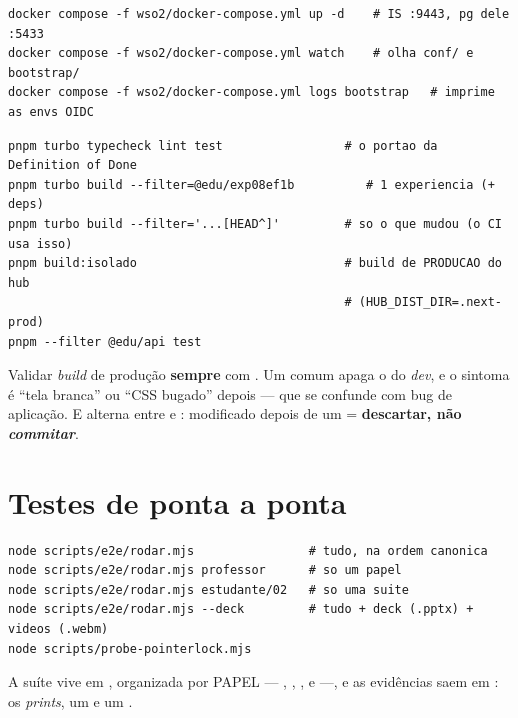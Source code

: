 \begin{lstlisting}[language=bashunoo, caption={O IdP sobe à parte}]
docker compose -f wso2/docker-compose.yml up -d    # IS :9443, pg dele :5433
docker compose -f wso2/docker-compose.yml watch    # olha conf/ e bootstrap/
docker compose -f wso2/docker-compose.yml logs bootstrap   # imprime as envs OIDC
\end{lstlisting}

\begin{lstlisting}[language=bashunoo, caption={Verificação e build}]
pnpm turbo typecheck lint test                 # o portao da Definition of Done
pnpm turbo build --filter=@edu/exp08ef1b          # 1 experiencia (+ deps)
pnpm turbo build --filter='...[HEAD^]'         # so o que mudou (o CI usa isso)
pnpm build:isolado                             # build de PRODUCAO do hub
                                               # (HUB_DIST_DIR=.next-prod)
pnpm --filter @edu/api test
\end{lstlisting}

\begin{atencao}
Validar \emph{build} de produção \textbf{sempre} com . Um
 comum apaga o  do \emph{dev}, e o sintoma é
\enquote{tela branca} ou \enquote{CSS bugado} depois --- que se confunde com bug
de aplicação. E  alterna entre  e
: modificado depois de um  = \textbf{descartar,
não \emph{commitar}}.
\end{atencao}

\section{Testes de ponta a ponta}

\begin{lstlisting}[language=bashunoo]
node scripts/e2e/rodar.mjs                # tudo, na ordem canonica
node scripts/e2e/rodar.mjs professor      # so um papel
node scripts/e2e/rodar.mjs estudante/02   # so uma suite
node scripts/e2e/rodar.mjs --deck         # tudo + deck (.pptx) + videos (.webm)
node scripts/probe-pointerlock.mjs
\end{lstlisting}

A suíte vive em , organizada por PAPEL --- ,
, ,  e  ---, e as
evidências saem em : os \emph{prints}, um
 e um .

